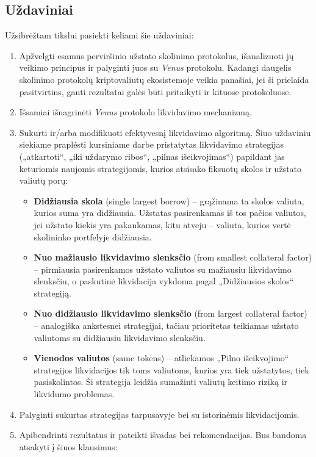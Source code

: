 \documentclass[]{VUMIFTemplateClass}
\begin{document}
\subsection{Uždaviniai}
Užsibrėžtam tikslui pasiekti keliami šie uždaviniai:
\begin{enumerate}
  \item Apžvelgti esamus perviršinio užstato skolinimo protokolus, išanalizuoti jų veikimo principus ir palyginti juos su \textit{Venus} protokolu. Kadangi daugelis skolinimo protokolų kriptovaliutų ekosistemoje veikia panašiai, jei ši prielaida pasitvirtins, gauti rezultatai galės būti pritaikyti ir kituose protokoluose.
  \item Išsamiai išnagrinėti \textit{Venus} protokolo likvidavimo mechanizmą.
  \item Sukurti ir/arba modifikuoti efektyvesnį likvidavimo algoritmą. Šiuo uždaviniu siekiame praplėsti kursiniame darbe pristatytas likvidavimo strategijas („atkartoti“, „iki uždarymo ribos“, „pilnas išeikvojimas“) papildant jas keturiomis naujomis strategijomis, kurios atsisako fiksuotų skolos ir užstato valiutų porų:
  \begin{itemize}
    \item \textbf{Didžiausia skola} (single largest borrow) – grąžinama ta skolos valiuta, kurios suma yra didžiausia. Užstatas pasirenkamas iš tos pačios valiutos, jei užstato kiekis yra pakankamas, kitu atveju – valiuta, kurios vertė skolininko portfelyje didžiausia.
    \item \textbf{Nuo mažiausio likvidavimo slenksčio} (from smallest collateral factor) – pirmiausia pasirenkamos užstato valiutos su mažiausiu likvidavimo slenksčiu, o paskutinė likvidacija vykdoma pagal „Didžiausios skolos“ strategiją.
    \item \textbf{Nuo didžiausio likvidavimo slenksčio} (from largest collateral factor) – analogiška ankstesnei strategijai, tačiau prioritetas teikiamas užstato valiutoms su didžiausiu likvidavimo slenksčiu.
    \item \textbf{Vienodos valiutos} (same tokens) – atliekamos „Pilno išeikvojimo“ strategijos likvidacijos tik toms valiutoms, kurios yra tiek užstatytos, tiek pasiskolintos. Ši strategija leidžia sumažinti valiutų keitimo riziką ir likvidumo problemas.
  \end{itemize}
  \item Palyginti sukurtas strategijas tarpusavyje bei su istorinėmis likvidacijomis.
  \item Apibendrinti rezultatus ir pateikti išvadas bei rekomendacijas. Bus bandoma atsakyti į šiuos klausimus:

\end{enumerate}
\end{document}
